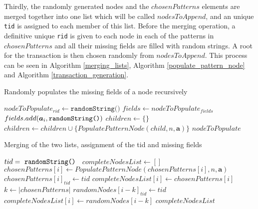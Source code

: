 \documentclass{acm_proc_article-sp-sigmod09}
\begin{document}
Thirdly, the randomly generated nodes and the $chosenPatterns$ elements are merged together into one list which will be called $nodesToAppend$, and an unique \texttt{tid} is assigned to each member of this list. Before the merging operation, a definitive unique \texttt{rid} is given to each node in each of the patterns in $chosenPatterns$ and all their missing fields are filled with random strings. A root for the transaction is then chosen randomly from $nodesToAppend$. This process can be seen in Algorithm \ref{merging_lists}, Algorithm \ref{populate_pattern_node} and Algorithm \ref{transaction_generation}.

\begin{algorithm}
\caption{Randomly populates the missing fields of a node recursively}
\label{populate_pattern_node}
\begin{algorithmic}[1]
\State $nodeToPopulate_{rid} \gets \texttt{randomString()}$
\State $fields \gets nodeToPopulate_{fields}$
		\State $fields.add(\boldsymbol{a}_i, \text{\texttt{randomString()}})$
	\EndIf
\EndFor
\State $children \gets \{\}$
	\State $children \gets children \cup \{PopulatePatternNode(child, n, \boldsymbol{a})\}$
\EndFor
\Return $nodeToPopulate$
\EndFunction
\end{algorithmic}
\end{algorithm}

\begin{algorithm}
\caption{Merging of the two lists, assignment of the tid and missing fields}
\label{merging_lists}
\begin{algorithmic}[1]
\State $tid = \text{ \texttt{randomString() }}$
\State $completeNodesList \gets []$
    \State $chosenPatterns[i] \gets PopulatePatternNode(chosenPatterns[i], n, \boldsymbol{a})$
    \State $chosenPatterns[i]_{tid} \gets tid$
    \State $completeNodesList[i] \gets chosenPatterns[i]$
\EndFor
\State $k \gets |chosenPatterns|$
    \State $randomNodes[i - k]_{tid} \gets tid$
    \State $completeNodesList[i] \gets randomNodes[i - k]$
\EndFor
\Return $completeNodesList$
\EndFunction
\end{algorithmic}
\end{algorithm}
\end{document}
